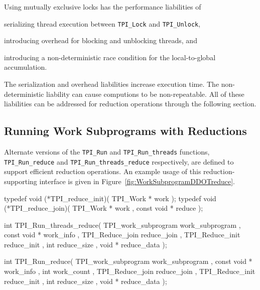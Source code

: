Using mutually exclusive locks has the performance liabilities of
\begin{blist}
\item serializing thread execution between \texttt{TPI\_Lock} and \texttt{TPI\_Unlock},
\item introducing overhead for blocking and unblocking threads, and
\item introducing a non-deterministic race condition for the local-to-global accumulation.
\end{blist}
%
The serialization and overhead liabilities increase execution time.
%
The non-deterministic liability can cause computions to be non-repeatable.
%
All of these liabilities can be addressed for reduction operations through the following section.


\clearpage
\subsection{Running Work Subprograms with Reductions} \label{sec:WorkSubprogramWithReduce}

Alternate versions of the \texttt{TPI\_Run} and \texttt{TPI\_Run\_threads} functions,
\texttt{TPI\_Run\_reduce} and \texttt{TPI\_Run\_threads\_reduce} respectively,
are defined to support efficient reduction operations.
%
An example usage of this reduction-supporting interface is given in
Figure~\ref{fig:WorkSubprogramDDOTreduce}.

\begin{center}
\small
\begin{boxedverbatim}
typedef void (*TPI_reduce_init)( TPI_Work * work );
typedef void (*TPI_reduce_join)( TPI_Work * work , const void * reduce );

int TPI_Run_threads_reduce( TPI_work_subprogram work_subprogram  ,
                            const void *        work_info ,
                            TPI_Reduce_join     reduce_join ,
                            TPI_Reduce_init     reduce_init ,
                            int                 reduce_size ,
                            void *              reduce_data );

int TPI_Run_reduce( TPI_work_subprogram work_subprogram  ,
                    const void *        work_info ,
                    int                 work_count  ,
                    TPI_Reduce_join     reduce_join ,
                    TPI_Reduce_init     reduce_init ,
                    int                 reduce_size ,
                    void *              reduce_data );
\end{boxedverbatim}
\end{center}

